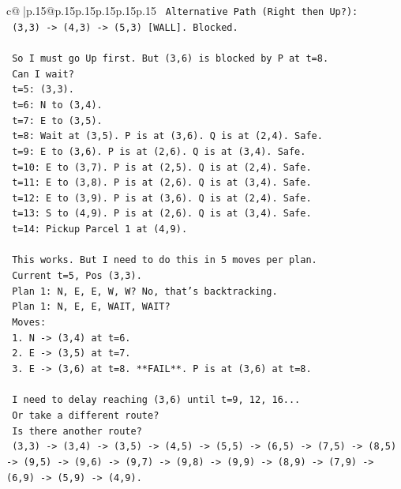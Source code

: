 \documentclass{article}
\begin{document}
{\begin{supertabular}{c@{$\;$}|p{.15\linewidth}@{}p{.15\linewidth}p{.15\linewidth}p{.15\linewidth}p{.15\linewidth}p{.15\linewidth}}
{{{\texttt{  Alternative Path (Right then Up?):} \\
\texttt{  (3,3) {-}> (4,3) {-}> (5,3) {[}WALL{]}. Blocked.} \\
\\ 
\texttt{  So I must go Up first. But (3,6) is blocked by P at t=8.} \\
\texttt{  Can I wait?} \\
\texttt{  t=5: (3,3).} \\
\texttt{  t=6: N to (3,4).} \\
\texttt{  t=7: E to (3,5).} \\
\texttt{  t=8: Wait at (3,5). P is at (3,6). Q is at (2,4). Safe.} \\
\texttt{  t=9: E to (3,6). P is at (2,6). Q is at (3,4). Safe.} \\
\texttt{  t=10: E to (3,7). P is at (2,5). Q is at (2,4). Safe.} \\
\texttt{  t=11: E to (3,8). P is at (2,6). Q is at (3,4). Safe.} \\
\texttt{  t=12: E to (3,9). P is at (3,6). Q is at (2,4). Safe.} \\
\texttt{  t=13: S to (4,9). P is at (2,6). Q is at (3,4). Safe.} \\
\texttt{  t=14: Pickup Parcel 1 at (4,9).} \\
\\ 
\texttt{  This works. But I need to do this in 5 moves per plan.} \\
\texttt{  Current t=5, Pos (3,3).} \\
\texttt{  Plan 1: N, E, E, W, W? No, that's backtracking.} \\
\texttt{  Plan 1: N, E, E, WAIT, WAIT?} \\
\texttt{  Moves:} \\
\texttt{  1. N {-}> (3,4) at t=6.} \\
\texttt{  2. E {-}> (3,5) at t=7.} \\
\texttt{  3. E {-}> (3,6) at t=8. **FAIL**. P is at (3,6) at t=8.} \\
\\ 
\texttt{  I need to delay reaching (3,6) until t=9, 12, 16...} \\
\texttt{  Or take a different route?} \\
\texttt{  Is there another route?} \\
\texttt{  (3,3) {-}> (3,4) {-}> (3,5) {-}> (4,5) {-}> (5,5) {-}> (6,5) {-}> (7,5) {-}> (8,5) {-}> (9,5) {-}> (9,6) {-}> (9,7) {-}> (9,8) {-}> (9,9) {-}> (8,9) {-}> (7,9) {-}> (6,9) {-}> (5,9) {-}> (4,9).} \\
}}}
\end{supertabular}}
\end{document}
